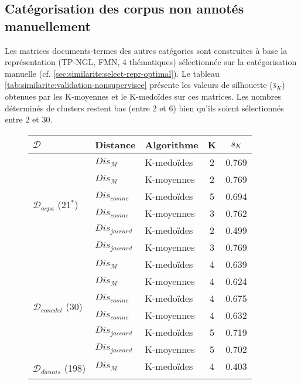 \subsection{Catégorisation des corpus non annotés manuellement}
Les matrices documents-termes des autres catégories sont construites à base la  représentation (TP-NGL, FMN,  4 thématiques) sélectionnée sur la catégorisation manuelle (cf. \ref{sec:similarite:select-repr-optimal}). Le tableau \ref{tab:similarite:validation-nonsupervisee} présente les valeurs de silhouette ($\bar{s}_K$) obtenues par les K-moyennes et le K-medoïdes sur ces matrices. Les nombres déterminés de clusters restent bas (entre 2 et 6) bien qu'ils soient sélectionnés entre 2 et 30. 
\newlength{\mrcell}
\setlength{\mrcell}{0.8cm}
\begin{table}[!htb]
	\scriptsize
\begin{center}
	\begin{subfigure}[ht]{0.49\textwidth}
	\begin{tabular}[pos]{|l|l|l|c|c|}
		\hline
		$\mathcal{D}$& Distance & Algorithme& {K}  & $\bar{s}_K$  \\ \hline
	\multirow{6}{\mrcell}{$\mathcal{D}_{acpa}$ (21$^*$)} & $Dis_\mathcal{M}$ & K-medoïdes & 2 & 0.769  \\ \cline{2-5}
	& $Dis_\mathcal{M}$ & K-moyennes & 2 & 0.769 \\ \cline{2-5}
	& $Dis_{cosine}$ & K-medoïdes & 5 & 0.694 \\ \cline{2-5}
	& $Dis_{cosine}$ & K-moyennes & 3 & 0.762  \\ \cline{2-5}
	& $Dis_{jaccard}$ & K-medoïdes & 2 & 0.499  \\ \cline{2-5}
	& $Dis_{jaccard}$ & K-moyennes & 3 & 0.769 \\ \hline
	\multirow{6}{\mrcell}{$\mathcal{D}_{concdel}$ (30)}  & $Dis_\mathcal{M}$ & K-medoïdes & 4 & 0.639  \\ \cline{2-5}
	& $Dis_\mathcal{M}$ & K-moyennes & 4 & 0.624  \\ \cline{2-5}
	& $Dis_{cosine}$ & K-medoïdes & 4 & 0.675  \\ \cline{2-5}
	& $Dis_{cosine}$ & K-moyennes & 4 & 0.632  \\ \cline{2-5}
	& $Dis_{jaccard}$ & K-medoïdes & 5 & 0.719  \\ \cline{2-5}
	& $Dis_{jaccard}$ & K-moyennes & 5 & 0.702\\ \hline
	\multirow{6}{\mrcell}{$\mathcal{D}_{danais}$ (198)} 
	& $Dis_\mathcal{M}$ & K-medoïdes & 4 & 0.403  \\ \cline{2-5}

\end{tabular}
\end{subfigure}
\end{center}
\end{table}
